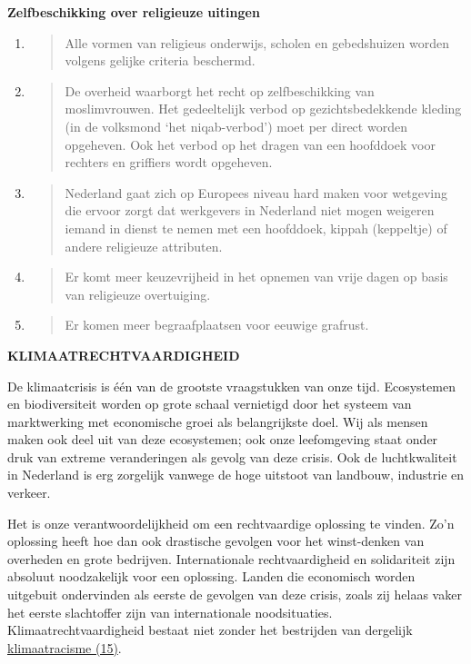 \textbf{Zelfbeschikking over religieuze uitingen}

\begin{enumerate}
\def\labelenumi{\arabic{enumi}.}
\item
  \begin{quote}
  Alle vormen van religieus onderwijs, scholen en gebedshuizen worden
  volgens gelijke criteria beschermd.
  \end{quote}
\item
  \begin{quote}
  De overheid waarborgt het recht op zelfbeschikking van moslimvrouwen.
  Het gedeeltelijk verbod op gezichtsbedekkende kleding (in de volksmond
  `het niqab-verbod') moet per direct worden opgeheven. Ook het verbod
  op het dragen van een hoofddoek voor rechters en griffiers wordt
  opgeheven.
  \end{quote}
\item
  \begin{quote}
  Nederland gaat zich op Europees niveau hard maken voor wetgeving die
  ervoor zorgt dat werkgevers in Nederland niet mogen weigeren iemand in
  dienst te nemen met een hoofddoek, kippah (keppeltje) of andere
  religieuze attributen.
  \end{quote}
\item
  \begin{quote}
  Er komt meer keuzevrijheid in het opnemen van vrije dagen op basis van
  religieuze overtuiging.
  \end{quote}
\item
  \begin{quote}
  Er komen meer begraafplaatsen voor eeuwige grafrust.
  \end{quote}
\end{enumerate}

\textbf{KLIMAATRECHTVAARDIGHEID}

De klimaatcrisis is één van de grootste vraagstukken van onze tijd.
Ecosystemen en biodiversiteit worden op grote schaal vernietigd door het
systeem van marktwerking met economische groei als belangrijkste doel.
Wij als mensen maken ook deel uit van deze ecosystemen; ook onze
leefomgeving staat onder druk van extreme veranderingen als gevolg van
deze crisis. Ook de luchtkwaliteit in Nederland is erg zorgelijk vanwege
de hoge uitstoot van landbouw, industrie en verkeer.

Het is onze verantwoordelijkheid om een rechtvaardige oplossing te
vinden. Zo'n oplossing heeft hoe dan ook drastische gevolgen voor het
winst-denken van overheden en grote bedrijven. Internationale
rechtvaardigheid en solidariteit zijn absoluut noodzakelijk voor een
oplossing. Landen die economisch worden uitgebuit ondervinden als eerste
de gevolgen van deze crisis, zoals zij helaas vaker het eerste
slachtoffer zijn van internationale noodsituaties.
Klimaatrechtvaardigheid bestaat niet zonder het bestrijden van dergelijk
\underline{klimaatracisme (15)}.

